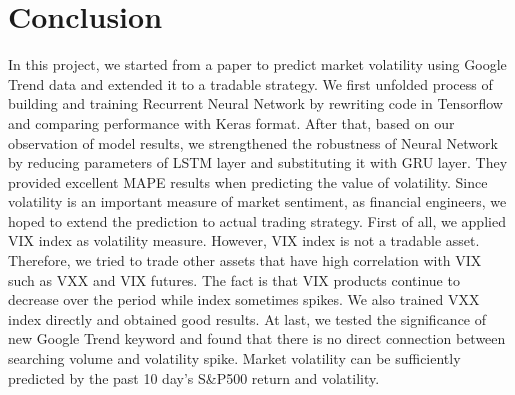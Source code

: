 \documentclass[11pt]{article}
\begin{document}
\begin{table}[htbp]
  \centering
  \caption{Prediction Accuracy for Adding One Keyword at A Time}
  \label{tab:addlabel}%
\end{table}%


\vspace{5mm}


\section{Conclusion}

In this project, we started from a paper to predict market volatility using Google Trend data and extended it to a tradable strategy. We first unfolded process of building and training Recurrent Neural Network by rewriting code in Tensorflow and comparing performance with Keras format. After that, based on our observation of model results, we strengthened the robustness of Neural Network by reducing parameters of LSTM layer and substituting it with GRU layer. They provided excellent MAPE results when predicting the value of volatility. Since volatility is an important measure of market sentiment, as financial engineers, we hoped to extend the prediction to actual trading strategy. First of all, we applied VIX index as volatility measure. However, VIX index is not a tradable asset. Therefore, we tried to trade other assets that have high correlation with VIX such as VXX and VIX futures. The fact is that VIX products continue to decrease over the period while index sometimes spikes. We also trained VXX index directly and obtained good results. At last, we tested the significance of new Google Trend keyword and found that there is no direct connection between searching volume and volatility spike. Market volatility can be sufficiently predicted by the past 10 day's S\&P500 return and volatility.
\end{document}
